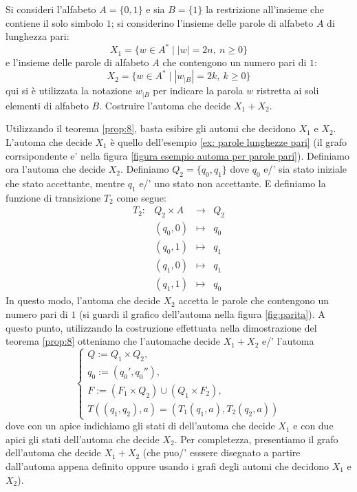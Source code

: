 \begin{ex}\label{es:3}
Si consideri l'alfabeto $A=\{0,1\}$ e sia $B=\{1\}$ la restrizione all'insieme che contiene il solo simbolo $1$; si considerino l'insieme delle parole di alfabeto $A$ di lunghezza pari:
\[
X_1 = \{ w \in A^* \mid |w| = 2n,\ n\geq 0 \}
\]
e l'insieme delle parole di alfabeto $A$ che contengono un numero pari di $1$:
\[
X_2 = \{ w \in A^* \mid |w_{|B}| = 2k,\ k\geq 0 \}
\]
qui si è utilizzata la notazione $w_{|B}$ per indicare la parola $w$ 
ristretta ai soli elementi di alfabeto $B$.
Costruire l'automa che decide $X_1+X_2$.
\end{ex}
\begin{sol}
Utilizzando il teorema 
\ref{prop:8},
basta esibire gli automi che decidono $X_1$ e $X_2$.
L'automa che decide $X_1$ è quello dell'esempio 
\ref{ex: parole lunghezze pari} (il grafo corrsipondente e' nella figura 
\ref{figura esempio automa per parole pari}).
Definiamo ora l'automa che decide $X_2$.
Definiamo $Q_2=\{q_0, q_1 \}$ dove $q_0$ e/' sia stato iniziale che stato accettante, mentre $q_1$ e/' uno stato non accettante.
E definiamo la funzione di transizione $T_2$ come segue:
\[
\begin{matrix}  
T_2: & Q_2 \times A & \to  & Q_2
\\
& (q_0,0) & \mapsto & q_0\\
& (q_0,1) & \mapsto & q_1\\
& (q_1,0) & \mapsto & q_1\\
& (q_1,1) & \mapsto & q_0   
\end{matrix}
\]
In questo modo, l'automa che decide $X_2$ 
accetta le parole che contengono un numero pari di $1$
(si guardi il grafico dell'automa nella figura \ref{fig:parita}).
A questo punto,
utilizzando la costruzione 
effettuata
nella dimostrazione 
del teorema \ref{prop:8}
otteniamo che l'automache decide 
$X_1 + X_2$
e/' l'automa
\[
\begin{cases}
    Q:= Q_1 \times Q_2,\\
    q_0 := (q_0',q_0''),\\
    F := (F_1 \times Q_2) \cup (Q_1 \times F_2),\\
    T((q_1,q_2),a) = (T_1(q_1,a), T_2(q_2,a))
\end{cases}
\]
dove con un apice indichiamo gli stati di dell'automa che decide 
$X_1$ e con due apici gli stati dell'automa che decide $X_2$.
Per completezza,
presentiamo il grafo dell'automa che decide $X_1 + X_2$
(che puo/' esssere disegnato a partire dall'automa appena definito
oppure usando i grafi degli automi che decidono $X_1$ e $X_2$).
\begin{center}
\end{center}
\end{sol}
